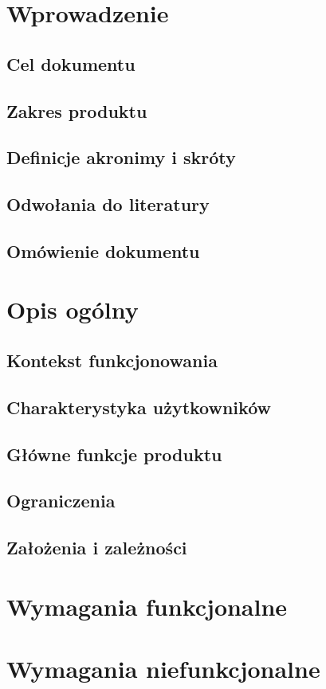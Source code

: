 \documentclass[10pt,a4paper]{article}
\begin{document}
\section{Wprowadzenie}
\subsection{Cel dokumentu}
\subsection{Zakres produktu}
\subsection{Definicje akronimy i skróty}
\subsection{Odwołania do literatury}
\subsection{Omówienie dokumentu}
\section{Opis ogólny}
\subsection{Kontekst funkcjonowania}
\subsection{Charakterystyka użytkowników}
\subsection{Główne funkcje produktu}
\subsection{Ograniczenia}
\subsection{Założenia i zależności}
\section{Wymagania funkcjonalne}
\section{Wymagania niefunkcjonalne}
\end{document}
